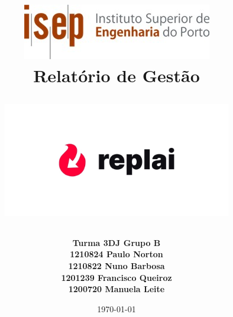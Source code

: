 \documentclass[]{report}
\title{
    \includegraphics{images/isep.jpg} \\
    \vfill
    \LARGE\bfseries Relatório de Gestão\\
    \begin{figure}[h]
    \centering
    \includegraphics[width=10cm]{images/logo-black.jpg}
    \label{fig:replaiLogo}
\end{figure}

    \vfill
    
    }
\author{
    \large\bfseries Turma 3DJ \textunderscore\space Grupo B \\
    1210824 \textunderscore\space Paulo Norton \\
    1210822 \textunderscore\space Nuno Barbosa \\
    1201239 \textunderscore\space Francisco Queiroz \\
    1200720 \textunderscore\space Manuela Leite\\
    }
\date{\today}
\begin{document}
\maketitle


\tableofcontents



%
\appendix


%
\listoffigures


\hypertarget{glossary}{\printglossaries}
\end{document}
